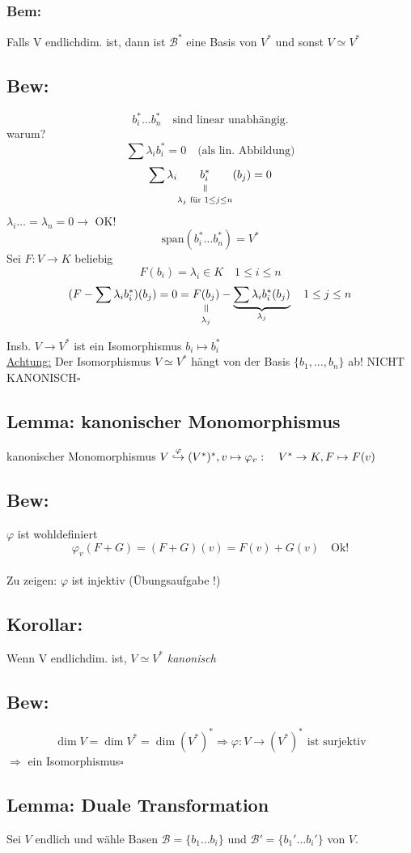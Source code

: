 \documentclass[titlepage,12pt,a4paper,ngerman]{report}
\newenvironment{bew}[1]{\subsection{Bew: #1}}{\hfill$\square$}
\newcommand{\Bew}[2]{\begin{bew}{#1}#2\end{bew}}
\newcommand{\verteq}{\rotatebox{90}{$\,=$}}
\newcommand{\equalto}[2]{\underset{\scriptstyle\overset{\mkern4mu\verteq}{#2}}{#1}}
\newcommand{\tx}[1]{\textrm{#1}}
\begin{document}
\subsubsection*{Bem:} Falls V endlichdim. ist, dann ist $ \mathcal{B}^*  $ eine Basis von $ V^* $ und sonst $ V\simeq V^* $

\Bew{}{
	$$b_i^* \dots b_n^* \quad \tx{sind linear unabhängig.}$$
	warum? $$\sum \lambda_i b_i^* = 0 \quad \tx{(als lin. Abbildung)}$$
	$$\sum \lambda_i \equalto{b_i^*}{\lambda_j \tx{ für } 1 \leq j \leq n}  (b_j) =0$$ 
	$\lambda_i \dots = \lambda_n = 0 \rightarrow$ OK!
	$$\tx{span}(b_i^* \dots b_n^*) = V^*$$
	Sei $F: V \to K$ beliebig 
	$$F(b_i) = \lambda_i \in K \quad 1 \leq i \leq n$$
	$$(F- \sum \lambda_i b_i^*) ( b_j) = 0 = \equalto{F(b_j)}{\lambda_j} - \underbrace{\sum \lambda_i b_i^* (b_j)}_{\lambda_j} \quad 1 \leq j \leq n$$
	
	Insb. $ V\to V^* $ ist ein Isomorphismus $  b_i \mapsto b_i^* $\\
	\underline{Achtung:} Der Isomorphismus $ V\simeq V^* $ hängt von der Basis $ \{b_1,\dots,b_n\} $ ab! NICHT KANONISCH}
\subsection{Lemma: kanonischer Monomorphismus} 
kanonischer Monomorphismus $ V \buildrel \varphi \over \hookrightarrow (V^*)^* , v \mapsto \varphi_v:\quad V^* \to K , F \mapsto F(v)$ 
\subsection{Bew:} $ \varphi $ ist wohldefiniert 
$$ \varphi_v(F+G) = (F+G) (v) = F(v)+ G(v) \quad \tx{Ok!}$$\\
Zu zeigen: $ \varphi $ ist injektiv (Übungsaufgabe !)
\subsection{Korollar: }
Wenn V endlichdim. ist, $ V \simeq V^* $ \emph{kanonisch}

\Bew{}{ 
	$$\dim V = \dim V^* = \dim (V^*)^* \Rightarrow \varphi: V \to (V^*)^* \tx{ ist surjektiv} $$
	$\Rightarrow $ ein Isomorphismus}
\subsection{Lemma: Duale Transformation}
Sei $V$ endlich und wähle Basen $\mathcal B = \{b_1 \dots b_i \}$ und $\mathcal B' = \{b_1' \dots b_i' \}$ von $V$.
\end{document}
